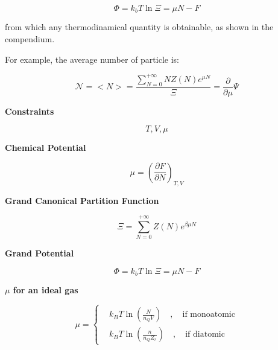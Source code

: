 \documentclass{article}
\begin{document}
\begin{equation}
    \Phi=k_bT\ln{\Xi}=\mu N-F
\end{equation}

from which any thermodinamical quantity is obtainable, as shown in the compendium.

For example, the average number of particle is:

\begin{equation}
    \mathcal{N}=<N>=\frac{\sum_{N=0}^{+\infty} N Z(N)e^{\mu N}}{\Xi}= \frac{\partial}{\partial \mu}\Psi
\end{equation}


\newpage
\begin{tcolorbox}[colframe=gray!90, colback=gray!5, coltitle=white, sharp corners, title=\textbf{Grand Canonical Ensamble, Summary}, fonttitle=\large\bfseries]

    \textbf{Constraints}

    \begin{equation}
        T, V, \mu
    \end{equation}

    \textbf{Chemical Potential}

    \begin{equation}
        \mu = \left( \frac{\partial F}{\partial N} \right)_{T,V}
    \end{equation}

    \textbf{Grand Canonical Partition Function}

    \begin{equation}
        \Xi = \sum_{N=0}^{+\infty} Z(N)e^{\beta\mu N}
    \end{equation}

    \textbf{Grand Potential}

    \begin{equation}
        \Phi = k_bT\ln{\Xi} = \mu N - F
    \end{equation}

    \textbf{\(\mu \) for an ideal gas}

    \begin{equation}
        \mu=
        \left\{
        \begin{aligned}
             & k_BT\ln{\left( \frac{N}{n_QV} \right)} \quad , \quad \text{if monoatomic}  \\
             & k_BT\ln{\left( \frac{n}{n_Q Z_r} \right)} \quad , \quad \text{if diatomic}
        \end{aligned}
        \right.
    \end{equation}


\end{tcolorbox}
\end{document}
